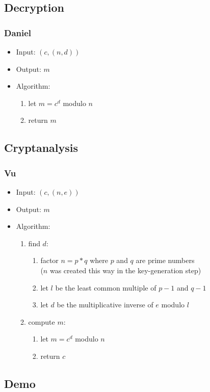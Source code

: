 
\subsection{Decryption}

\begin{frame}
\frametitle{Daniel}
\begin{itemize}
\item Input: $(c, (n, d))$
\item Output: $m$
\item Algorithm:
  \begin{enumerate}
  \item let $m = c^d$ modulo $n$
  \item return $m$
  \end{enumerate}
\end{itemize}
\end{frame}


\subsection{Cryptanalysis}

\begin{frame}
\frametitle{Vu}
\begin{itemize}
\item Input: $(c, (n, e))$
\item Output: $m$
\item Algorithm:
  \begin{enumerate}
  \item find $d$:
    \begin{enumerate}
    \item factor $n = p * q$ where
      $p$ and $q$ are prime numbers \\
      ($n$ was created this way in the key-generation step)
    \item let $l$ be the least common multiple of
      $p - 1$ and $q - 1$
    \item let $d$ be the multiplicative inverse of $e$
      modulo $l$
    \end{enumerate}
  \item compute $m$:
    \begin{enumerate}
    \item let $m = c^d$ modulo $n$
    \item return $c$
    \end{enumerate}
  \end{enumerate}
\end{itemize}
\end{frame}


\subsection{Demo}

\begin{frame}
\frametitle{}

\end{frame}

\begin{frame}
\frametitle{}

\end{frame}
